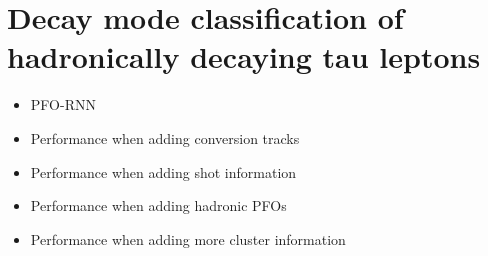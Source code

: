 \chapter{Decay mode classification of hadronically decaying tau leptons}
\label{sec:decaymode}

\begin{itemize}
\item PFO-RNN

\item Performance when adding conversion tracks

\item Performance when adding shot information

\item Performance when adding hadronic PFOs

\item Performance when adding more cluster information

\end{itemize}
